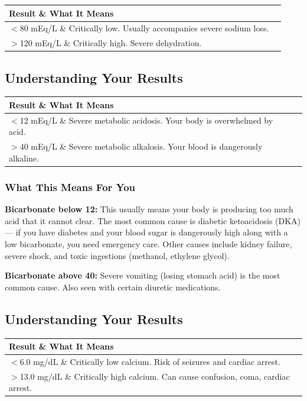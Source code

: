 \begin{longtable}{@{}ll@{}}
\toprule
\textbf{Result} \& \textbf{What It Means} \\
\midrule
$<$80 mEq/L \& Critically low. Usually accompanies severe sodium loss. \\
$>$120 mEq/L \& Critically high. Severe dehydration. \\
\bottomrule
\end{longtable}

\subsection{Understanding Your Results}

\begin{longtable}{@{}ll@{}}
\toprule
\textbf{Result} \& \textbf{What It Means} \\
\midrule
$<$12 mEq/L \& Severe metabolic acidosis. Your body is overwhelmed by acid. \\
$>$40 mEq/L \& Severe metabolic alkalosis. Your blood is dangerously alkaline. \\
\bottomrule
\end{longtable}

\subsubsection{What This Means For You}

\textbf{Bicarbonate below 12:} This usually means your body is producing too much acid that it cannot clear. The most common cause is diabetic ketoacidosis (DKA) --- if you have diabetes and your blood sugar is dangerously high along with a low bicarbonate, you need emergency care. Other causes include kidney failure, severe shock, and toxic ingestions (methanol, ethylene glycol).

\textbf{Bicarbonate above 40:} Severe vomiting (losing stomach acid) is the most common cause. Also seen with certain diuretic medications.

\subsection{Understanding Your Results}

\begin{longtable}{@{}ll@{}}
\toprule
\textbf{Result} \& \textbf{What It Means} \\
\midrule
$<$6.0 mg/dL \& Critically low calcium. Risk of seizures and cardiac arrest. \\
$>$13.0 mg/dL \& Critically high calcium. Can cause confusion, coma, cardiac arrest. \\
\bottomrule
\end{longtable}

